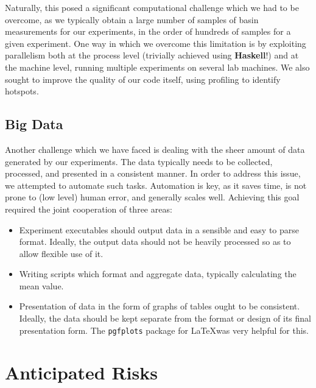 Naturally, this posed a significant computational challenge which we had to be overcome, as we typically obtain a large number of samples of basin measurements for our experiments, in the order of hundreds of samples for a given experiment. One way in which we overcome this limitation is by exploiting parallelism both at the process level (trivially achieved using \textbf{Haskell}!) and at the machine level, running multiple experiments on several lab machines. We also sought to improve the quality of our code itself, using profiling to identify hotspots. 


\subsection{Big Data}

Another challenge which we have faced is dealing with the sheer amount of data generated by our experiments. The data typically needs to be collected, processed, and presented in a consistent manner. In order to address this issue, we attempted to automate such tasks. Automation is key, as it saves time, is not prone to (low level) human error, and generally scales well. Achieving this goal required the joint cooperation of three areas:

\begin{itemize}
\item Experiment executables should output data in a sensible and easy to parse format. Ideally, the output data should not be heavily processed so as to allow flexible use of it.

\item Writing scripts which format and aggregate data, typically calculating the mean value.

\item Presentation of data in the form of graphs of tables ought to be consistent. Ideally, the data should be kept separate from the format or design of its final presentation form. The \texttt{pgfplots} package for \LaTeX was very helpful for this.
\end{itemize}


\section{Anticipated Risks}

